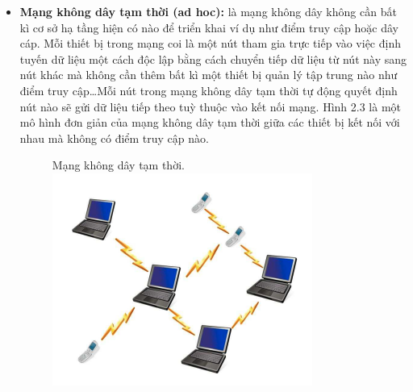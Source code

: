 \documentclass{uetgraduation}
\begin{document}
\begin{itemize}
    Mạng cảm biến không dây có một số ứng dụng sau:
    \begin{itemize}
        \item Sử dụng trong lĩnh vực an ninh như giám sát ở các khu vực nhạy cảm để phát hiện các mối đe doạ như tấn công sinh học hoặc hoá học\dots
        \item Giám sát môi trường: WSN hỗ trợ thu thập thông tin ở những khu vực khó thiết lập cơ sở hạ tầng để giám sát môi trường cũng như môi trường sống.
        \item Trong y học: sử dụng để giúp các bác sĩ theo dõi sức khoẻ của bệnh nhân.
        \item Theo dõi đối tượng: WSN có thể dùng để theo dõi các đối tượng chuyển động nếu sử dụng cảm biến phù hợp.
        \item Hỗ trợ người khuyết tật: Người khuyết tật có thể độc lập hơn và cải thiện khả năng hoạt động với việc sử dụng WSN, WSN cho phép tự chăm sóc hiệu
        quả hơn và nâng cao chất lượng cuộc sống.
    \end{itemize}

    \item \textbf{Mạng không dây tạm thời (ad hoc):} là mạng không dây không cần bất kì cơ sở hạ tầng hiện có nào để triển khai ví dụ như điểm truy cập hoặc dây cáp.
    Mỗi thiết bị trong mạng coi là một nút tham gia trực tiếp vào việc định tuyến dữ liệu một cách độc lập bằng cách chuyển tiếp dữ liệu từ nút này sang nút khác
    mà không cần thêm bất kì một thiết bị quản lý tập trung nào như điểm truy cập\dots Mỗi nút trong mạng không dây tạm thời tự động quyết định nút nào sẽ gửi dữ
    liệu tiếp theo tuỳ thuộc vào kết nối mạng. Hình 2.3 là một mô hình đơn giản của mạng không dây tạm thời giữa các thiết bị kết nối với nhau mà không có điểm
    truy cập nào.
    \begin{figure}{Mạng không dây tạm thời.}
        \centering
        \includegraphics[scale=0.6]{ad_hoc}
        \label{fig:adhoc}
    \end{figure}


\end{itemize}
\end{document}
